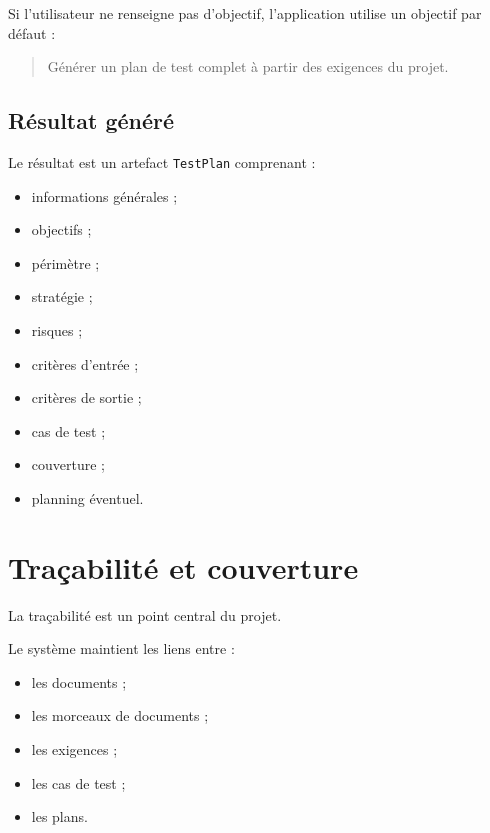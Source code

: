 \documentclass[
  french,
]{report}
\providecommand{\tightlist}{%
  \setlength{\itemsep}{0pt}\setlength{\parskip}{0pt}}
\begin{document}
Si l'utilisateur ne renseigne pas d'objectif, l'application utilise un
objectif par défaut :

\begin{quote}
Générer un plan de test complet à partir des exigences du projet.
\end{quote}

\section{Résultat généré}\label{ruxe9sultat-guxe9nuxe9ruxe9}

Le résultat est un artefact \texttt{TestPlan} comprenant :

\begin{itemize}
\tightlist
\item
  informations générales ;
\item
  objectifs ;
\item
  périmètre ;
\item
  stratégie ;
\item
  risques ;
\item
  critères d'entrée ;
\item
  critères de sortie ;
\item
  cas de test ;
\item
  couverture ;
\item
  planning éventuel.
\end{itemize}

\chapter{Traçabilité et
couverture}\label{trauxe7abilituxe9-et-couverture}

La traçabilité est un point central du projet.

\begin{center}
\end{center}

Le système maintient les liens entre :

\begin{itemize}
\tightlist
\item
  les documents ;
\item
  les morceaux de documents ;
\item
  les exigences ;
\item
  les cas de test ;
\item
  les plans.
\end{itemize}
\end{document}
